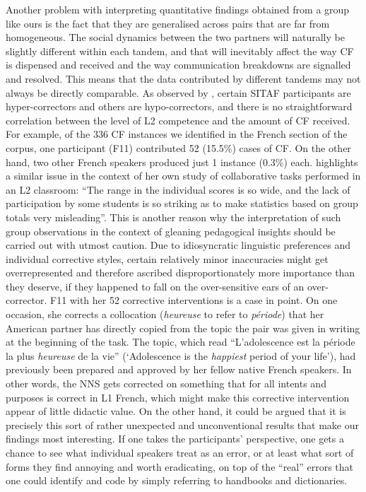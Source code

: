 \documentclass[output=paper,colorlinks,citecolor=brown,modfonts,nonflat]{../langscibook}
\begin{document}
Another problem with interpreting quantitative findings obtained from a group like ours is the fact that they are generalised across pairs that are far from homogeneous. The social dynamics between the two partners will naturally be slightly different within each tandem, and that will inevitably affect the way CF is dispensed and received and the way communication breakdowns are signalled and resolved. This means that the data contributed by different tandems may not always be directly comparable. As observed by \citet{HorguesTardieu2015}, certain SITAF participants are hyper-correctors and others are hypo-correctors, and there is no straightforward correlation between the level of L2 competence and the amount of CF received. For example, of the 336 CF instances we identified in the French section of the corpus, one participant (F11) contributed 52 (15.5\%) cases of CF. On the other hand, two other French speakers produced just 1 instance (0.3\%) each. \citet[25]{Foster1993} highlights a similar issue in the context of her own study of collaborative tasks performed in an L2 classroom: “The range in the individual scores is so wide, and the lack of participation by some students is so striking as to make statistics based on group totals very misleading”. This is another reason why the interpretation of such group observations in the context of gleaning pedagogical insights should be carried out with utmost caution. Due to idiosyncratic linguistic preferences and individual corrective styles, certain relatively minor inaccuracies might get overrepresented and therefore ascribed disproportionately more importance than they deserve, if they happened to fall on the over-sensitive ears of an over-corrector. F11 with her 52 corrective interventions is a case in point. On one occasion, she corrects a collocation (\textit{heureuse} to refer to \textit{période}) that her American partner has directly copied from the topic the pair was given in writing at the beginning of the task. The topic, which read “L’adolescence est la période la plus \textit{heureuse} de la vie” (‘Adolescence is the \textit{happiest} period of your life’), had previously been prepared and approved by her fellow native French speakers. In other words, the NNS gets corrected on something that for all intents and purposes is correct in L1 French, which might make this corrective intervention appear of little didactic value. On the other hand, it could be argued that it is precisely this sort of rather unexpected and unconventional results that make our findings most interesting. If one takes the participants’ perspective, one gets a chance to see what individual speakers treat as an error, or at least what sort of forms they find annoying and worth eradicating, on top of the “real” errors that one could identify and code by simply referring to handbooks and dictionaries.
\end{document}
